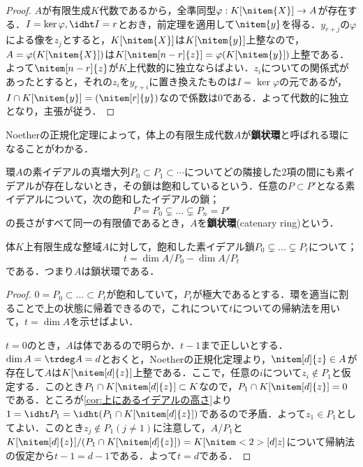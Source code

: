 \begin{proof}
	$A$が有限生成$K$代数であるから，全準同型$\varphi:K[\nitem{X}]\to A$が存在する．$I=\ker\varphi, \idht I=r$とおき，前定理を適用して$\nitem{y}$を得る．$y_{r+j}$の$\varphi$による像を$z_j$とすると，$K[\nitem{X}]$は$K[\nitem{y}]$上整なので，$A=\varphi(K[\nitem{X}])$は$K[\nitem[n-r]{z}]=\varphi(K[\nitem{y}])$上整である．よって$\nitem[n-r]{z}$が$K$上代数的に独立ならばよい．$z_i$についての関係式があったとすると，それの$z_i$を$y_{r+i}$に置き換えたものは$I=\ker\varphi$の元であるが，$I\cap K[\nitem{y}]=(\nitem[r]{y})$なので係数は0である．よって代数的に独立となり，主張が従う．
\end{proof}

Noetherの正規化定理によって，体上の有限生成代数$A$が\textbf{鎖状環}と呼ばれる環になることがわかる．
\begin{defi}[鎖状環]
	環$A$の素イデアルの真増大列$P_0\subset P_1\subset\cdots$についてどの隣接した2項の間にも素イデアルが存在しないとき，その鎖は飽和しているという．任意の$P\subset P'$となる素イデアルについて，次の飽和したイデアルの鎖；
	\[P=P_0\subsetneq\dots\subsetneq P_n= P'\]
	の長さがすべて同一の有限値であるとき，$A$を\textbf{鎖状環}(catenary ring)という．
\end{defi}

\begin{thm}\label{thm:体上有限生成整域は鎖状環}
	体$K$上有限生成な整域$A$に対して，飽和した素イデアル鎖$P_0\subsetneq\dots\subsetneq P_t$について；
	\[t=\dim A/P_0-\dim A/P_t\]
	である．つまり$A$は鎖状環である．
\end{thm}

\begin{proof}
	$0=P_0\subset\dots\subset P_t$が飽和していて，$P_t$が極大であるとする．環を適当に割ることで上の状態に帰着できるので，これについて$t$についての帰納法を用いて，$t=\dim A$を示せばよい．
		
	$t=0$のとき，$A$は体であるので明らか．$t-1$まで正しいとする．$\dim A=\trdeg A=d$とおくと，Noetherの正規化定理より，$\nitem[d]{z}\in A$が存在して$A$は$K[\nitem[d]{z}]$上整である．ここで，任意の$i$について$z_i\not\in P_1$と仮定する．このとき$P_1\cap K[\nitem[d]{z}]\subset K$なので，$P_1\cap K[\nitem[d]{z}]=0$である．ところが\ref{cor:上にあるイデアルの高さ}より$1=\idht P_1=\idht (P_1\cap K[\nitem[d]{z}])$であるので矛盾．よって$z_1\in P_1$としてよい．このとき$z_j\not\in P_1 (j\neq1)$に注意して，$A/P_1$と$K[\nitem[d]{z}]/(P_1\cap K[\nitem[d]{z}])=K[\nitem<2>[d]{z}]$について帰納法の仮定から$t-1=d-1$である．よって$t=d$である．
\end{proof}


